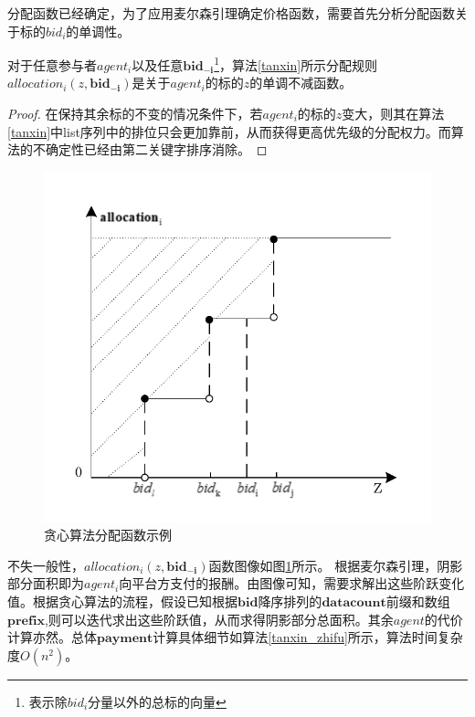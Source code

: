\documentclass[promaster]{thesis-uestc}
\begin{document}
分配函数已经确定，为了应用麦尔森引理确定价格函数，需要首先分析分配函数关于标的$bid_i$的单调性。

\begin{theorem}
    对于任意参与者$agent_i$以及任意$\mathbf{bid_{-i}}$\footnote{表示除$bid_i$分量以外的总标的向量}，算法\ref{tanxin}所示分配规则$allocation_i(z,\mathbf{bid_{-i}})$是关于$agent_i$的标的$z$的单调不减函数。
\end{theorem}

\begin{proof}
   在保持其余标的不变的情况条件下，若$agent_i$的标的$z$变大，则其在算法\ref{tanxin}中list序列中的排位只会更加靠前，从而获得更高优先级的分配权力。而算法的不确定性已经由第二关键字排序消除。
\end{proof}



\begin{figure}[h]
    \includegraphics{pic/tanxin_allocation.pdf}
    \caption{贪心算法分配函数示例}
    \label{tanxin_allocation}
\end{figure}

不失一般性，$allocation_i(z,\mathbf{bid_{-i}})$函数图像如图\ref{tanxin_allocation}所示。
根据麦尔森引理，阴影部分面积即为$agent_i$向平台方支付的报酬。由图像可知，需要求解出这些阶跃变化值。根据贪心算法的流程，假设已知根据$\mathbf{bid}$降序排列的$\mathbf{datacount}$前缀和数组$\mathbf{prefix}$,则可以迭代求出这些阶跃值，从而求得阴影部分总面积。其余$agent$的代价计算亦然。总体$\mathbf{payment}$计算具体细节如算法\ref{tanxin_zhifu}所示，算法时间复杂度$O(n^2)$。
\end{document}
